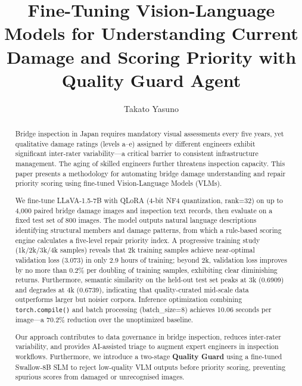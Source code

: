 \documentclass[twocolumn]{article}
\title{Fine-Tuning Vision-Language Models for Understanding Current Damage and Scoring Priority with Quality Guard Agent}
\author[1]{Takato Yasuno}
\date{}
\begin{document}
\renewcommand{\abstractname}{Abstract}
\renewcommand{\refname}{References}
\renewcommand{\figurename}{Figure}
\renewcommand{\tablename}{Table}

\maketitle

\begin{abstract}

Bridge inspection in Japan requires mandatory visual assessments every five years,
yet qualitative damage ratings (levels a--e) assigned by different engineers exhibit
significant inter-rater variability---a critical barrier to consistent infrastructure
management. The aging of skilled engineers further threatens inspection capacity.
This paper presents a methodology for automating bridge damage understanding and
repair priority scoring using fine-tuned Vision-Language Models (VLMs).

We fine-tune LLaVA-1.5-7B with QLoRA (4-bit NF4 quantization, rank=32) on
up to 4{,}000 paired bridge damage images and inspection text records, then
evaluate on a fixed test set of 800 images. The model outputs natural language
descriptions identifying structural members and damage patterns, from which
a rule-based scoring engine calculates a five-level repair priority index.
A progressive training study (1k/2k/3k/4k samples) reveals that 2k training
samples achieve near-optimal validation loss (3.073) in only 2.9 hours of
training; beyond 2k, validation loss improves by no more than 0.2\% per
doubling of training samples, exhibiting clear diminishing returns.
Furthermore, semantic similarity on the held-out test set peaks at 3k (0.6909)
and degrades at 4k (0.6739), indicating that quality-curated mid-scale data
outperforms larger but noisier corpora.
Inference optimization combining \texttt{torch.compile()} and batch processing
(batch\_size=8) achieves 10.06 seconds per image---a 70.2\% reduction over the
unoptimized baseline.

Our approach contributes to data governance in bridge inspection, reduces
inter-rater variability, and provides AI-assisted triage to augment
expert engineers in inspection workflows.
Furthermore, we introduce a two-stage \textbf{Quality Guard} using a
fine-tuned Swallow-8B SLM to reject low-quality VLM outputs before
priority scoring, preventing spurious scores from damaged or unrecognised images.

\end{abstract}
\end{document}
